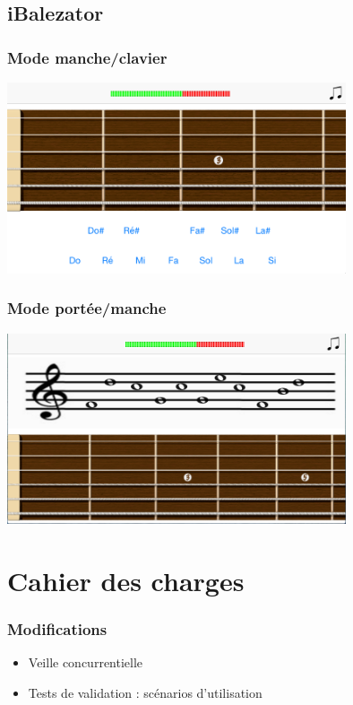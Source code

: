 \documentclass{beamer}
\begin{document}
	\subsection{iBalezator}

	\begin{frame}
		\frametitle{Mode manche/clavier}
			\includegraphics[width=10cm]{images/clavier_vierge.png}
	\end{frame}

	\begin{frame}
		\frametitle{Mode portée/manche}
			\includegraphics[width=10cm]{images/portee_vierge.png}
 
	\end{frame}


\section{Cahier des charges}

\begin{frame}
	\frametitle{Modifications}

	\begin{itemize}
		\item Veille concurrentielle 	
		\item Tests de validation : scénarios d'utilisation
	\end{itemize}
\end{frame}
\end{document}
